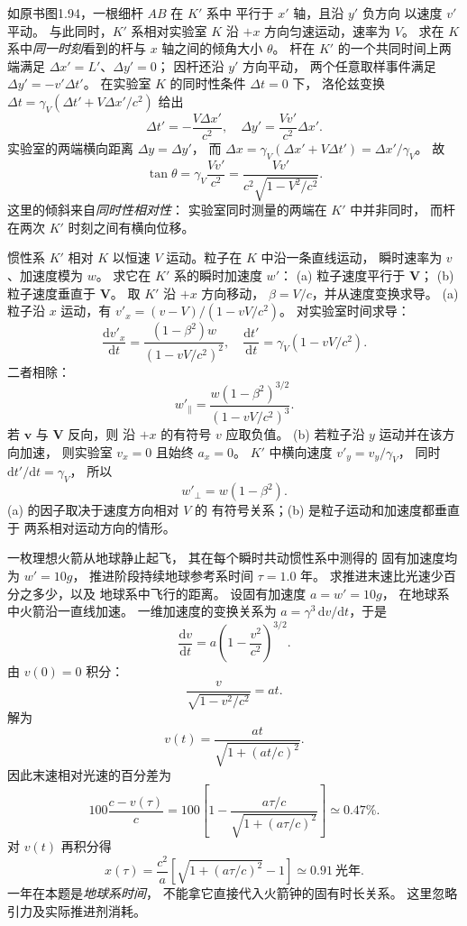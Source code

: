 如原书图1.94，一根细杆 $AB$ 在 $K'$ 系中
平行于 $x'$ 轴，且沿 $y'$ 负方向
以速度 $v'$ 平动。
与此同时，$K'$ 系相对实验室 $K$
沿 $+x$ 方向匀速运动，速率为 $V$。
求在 $K$ 系中\emph{同一时刻}看到的杆与
$x$ 轴之间的倾角大小 $\theta$。
\exsolution
杆在 $K'$ 的一个共同时间上两端满足
$\Delta x'=L'$、$\Delta y'=0$；
因杆还沿 $y'$ 方向平动，
两个任意取样事件满足
$\Delta y'=-v'\Delta t'$。
在实验室 $K$ 的同时性条件 $\Delta t=0$ 下，
洛伦兹变换
$\Delta t=\gamma_V(\Delta t'+V\Delta x'/c^2)$
给出
\[
\Delta t'=-\frac{V\Delta x'}{c^2},
\quad
\Delta y'=\frac{Vv'}{c^2}\Delta x'.
\]
实验室的两端横向距离
$\Delta y=\Delta y'$，
而
$\Delta x=\gamma_V(\Delta x'+V\Delta t')
=\Delta x'/\gamma_V$。
故
\[
\boxed{\tan\theta=
\gamma_V\frac{Vv'}{c^2}
=\frac{Vv'}{c^2\sqrt{1-V^2/c^2}}}.
\]
\excheck 这里的倾斜来自\emph{同时性相对性}：
实验室同时测量的两端在 $K'$ 中并非同时，
而杆在两次 $K'$ 时刻之间有横向位移。

惯性系 $K'$ 相对 $K$ 以恒速 $V$
运动。粒子在 $K$ 中沿一条直线运动，
瞬时速率为 $v$、加速度模为 $w$。
求它在 $K'$ 系的瞬时加速度 $w'$：
(a) 粒子速度平行于 $\bm V$；
(b) 粒子速度垂直于 $\bm V$。
\exsolution
取 $K'$ 沿 $+x$ 方向移动，
$\beta=V/c$，并从速度变换求导。
(a) 粒子沿 $x$ 运动，有
$v'_x=(v-V)/(1-vV/c^2)$。
对实验室时间求导：
\[
\frac{\mathrm dv'_x}{\mathrm dt}
=\frac{(1-\beta^2)w}{(1-vV/c^2)^2},
\quad
\frac{\mathrm dt'}{\mathrm dt}
=\gamma_V(1-vV/c^2).
\]
二者相除：
\[
\boxed{w'_\parallel=
\frac{w(1-\beta^2)^{3/2}}
{(1-vV/c^2)^3}}.
\]
若 $\bm v$ 与 $\bm V$ 反向，则
沿 $+x$ 的有符号 $v$ 应取负值。
(b) 若粒子沿 $y$ 运动并在该方向加速，
则实验室 $v_x=0$ 且始终 $a_x=0$。
$K'$ 中横向速度 $v'_y=v_y/\gamma_V$，
同时 $\mathrm dt'/\mathrm dt=\gamma_V$，
所以
\[
\boxed{w'_\perp=w(1-\beta^2)}.
\]
\excheck (a) 的因子取决于速度方向相对 $V$ 的
有符号关系；(b) 是粒子运动和加速度都垂直于
两系相对运动方向的情形。

一枚理想火箭从地球静止起飞，
其在每个瞬时共动惯性系中测得的
固有加速度均为 $w'=10g$，
推进阶段持续地球参考系时间
$\tau=1.0$ 年。
求推进末速比光速少百分之多少，以及
地球系中飞行的距离。
\exsolution
设固有加速度 $a=w'=10g$，
在地球系中火箭沿一直线加速。
一维加速度的变换关系为
$a=\gamma^3\,\mathrm dv/\mathrm dt$，于是
\[
\frac{\mathrm dv}{\mathrm dt}
=a\left(1-\frac{v^2}{c^2}\right)^{3/2}.
\]
由 $v(0)=0$ 积分：
\[
\frac{v}{\sqrt{1-v^2/c^2}}=at.
\]
解为
\[
\boxed{v(t)=\frac{at}{\sqrt{1+(at/c)^2}}}.
\]
因此末速相对光速的百分差为
\[
\boxed{100\frac{c-v(\tau)}c
=100\left[1-\frac{a\tau/c}{\sqrt{1+(a\tau/c)^2}}\right]
\simeq0.47\%}.
\]
对 $v(t)$ 再积分得
\[
\boxed{x(\tau)=\frac{c^2}{a}
\left[\sqrt{1+(a\tau/c)^2}-1\right]
\simeq0.91\ \text{光年}}.
\]
\excheck 一年在本题是\emph{地球系时间}，
不能拿它直接代入火箭钟的固有时长关系。
这里忽略引力及实际推进剂消耗。

